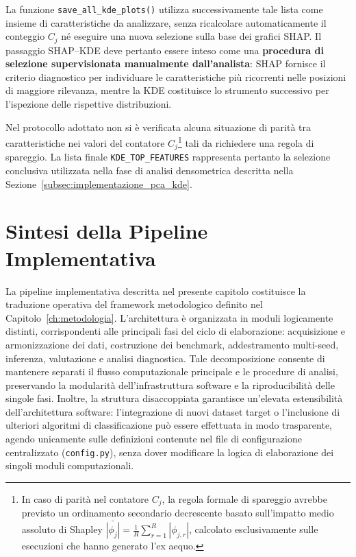 La funzione \texttt{save\_all\_kde\_plots()} utilizza successivamente tale lista come insieme di caratteristiche da analizzare, senza ricalcolare automaticamente il conteggio $C_j$ né eseguire una nuova selezione sulla base dei grafici SHAP. 
Il passaggio SHAP--KDE deve pertanto essere inteso come una \textbf{procedura di selezione supervisionata manualmente dall'analista}: SHAP fornisce il criterio diagnostico per individuare le caratteristiche più ricorrenti nelle posizioni di maggiore rilevanza, mentre la KDE costituisce lo strumento successivo per l'ispezione delle rispettive distribuzioni.

Nel protocollo adottato non si è verificata alcuna situazione di parità tra caratteristiche nei valori del contatore $C_j$\footnote{In caso di parità nel contatore $C_j$, la regola formale di spareggio avrebbe previsto un ordinamento secondario decrescente basato sull'impatto medio assoluto di Shapley $\bar{|\phi_j|} = \frac{1}{R} \sum_{r=1}^{R} |\phi_{j,r}|$, calcolato esclusivamente sulle esecuzioni che hanno generato l'ex aequo.} tali da richiedere una regola di spareggio. 
La lista finale \texttt{KDE\_TOP\_FEATURES} rappresenta pertanto la selezione conclusiva utilizzata nella fase di analisi densometrica descritta nella Sezione~\ref{subsec:implementazione_pca_kde}.


\section{Sintesi della Pipeline Implementativa}
\label{sec:sintesi_pipeline_implementativa}
 
La pipeline implementativa descritta nel presente capitolo costituisce la traduzione operativa del framework metodologico definito nel Capitolo~\ref{ch:metodologia}.
L'architettura è organizzata in moduli logicamente distinti, corrispondenti alle principali fasi del ciclo di elaborazione: acquisizione e armonizzazione dei dati, costruzione dei benchmark, addestramento multi-seed, inferenza, valutazione e analisi diagnostica.
Tale decomposizione consente di mantenere separati il flusso computazionale principale e le procedure di analisi, preservando la modularità dell'infrastruttura software e la riproducibilità delle singole fasi.
Inoltre, la struttura disaccoppiata garantisce un'elevata estensibilità dell'architettura software: l'integrazione di nuovi dataset target o l'inclusione di ulteriori algoritmi di classificazione può essere effettuata in modo trasparente, agendo unicamente sulle definizioni contenute nel file di configurazione centralizzato (\texttt{config.py}), senza dover modificare la logica di elaborazione dei singoli moduli computazionali.
 
